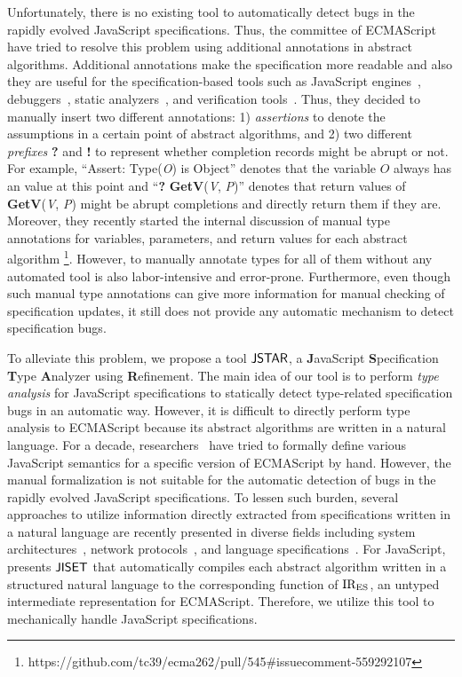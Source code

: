 Unfortunately, there is no existing tool to automatically detect bugs in the
rapidly evolved JavaScript specifications.  Thus, the committee of ECMAScript
have tried to resolve this problem using additional annotations in abstract
algorithms.  Additional annotations make the specification more readable and
also they are useful for the specification-based tools such as JavaScript
engines~\cite{v8, graaljs, qjs, moddable}, debuggers~\cite{jsexplain}, static
analyzers~\cite{safe, tajs, jsai, wala}, and verification tools~\cite{javert,
javert2}.  Thus, they decided to manually insert two different annotations: 1)
\textit{assertions} to denote the assumptions in a certain point of abstract
algorithms, and 2) two different \textit{prefixes} \textbf{?} and \textbf{!} to
represent whether completion records might be abrupt or not.  For example,
``Assert: Type(\textit{O}) is Object'' denotes that the variable $\textit{O}$
always has an  value at this point and ``\textbf{?}
\textbf{GetV}(\textit{V}, \textit{P})'' denotes that return values of
\textbf{GetV}(\textit{V}, \textit{P}) might be abrupt completions and directly
return them if they are.  Moreover, they recently started the internal
discussion of manual type annotations for variables, parameters, and return
values for each abstract algorithm
\footnote{https://github.com/tc39/ecma262/pull/545\#issuecomment-559292107}.
However, to manually annotate types for all of them without any automated tool
is also labor-intensive and error-prone.  Furthermore, even though such manual
type annotations can give more information for manual checking of specification
updates, it still does not provide any automatic mechanism to detect
specification bugs.

To alleviate this problem, we propose a tool $\tool$, a \textbf{J}avaScript
\textbf{S}pecification \textbf{T}ype \textbf{A}nalyzer using
\textbf{R}efinement.  The main idea of our tool is to perform \textit{type
analysis} for JavaScript specifications to statically detect type-related
specification bugs in an automatic way.  However, it is difficult to directly
perform type analysis to ECMAScript because its abstract algorithms are written
in a natural language.  For a decade, researchers~\cite{lambdajs, jscert, kjs}
have tried to formally define various JavaScript semantics for a specific
version of ECMAScript by hand.  However, the manual formalization is not
suitable for the automatic detection of bugs in the rapidly evolved JavaScript
specifications.  To lessen such burden, several approaches to utilize
information directly extracted from specifications written in a natural language
are recently presented in diverse fields including system
architectures~\cite{x86, arm}, network protocols~\cite{basespec}, and language
specifications~\cite{spectest, javadoc}.  For JavaScript, \citet{jiset} presents
$\jiset$ that automatically compiles each abstract algorithm written in a
structured natural language to the corresponding function of ${\text{IR}_\text{ES}}$, an untyped
intermediate representation for ECMAScript.  Therefore, we utilize this tool to
mechanically handle JavaScript specifications.

